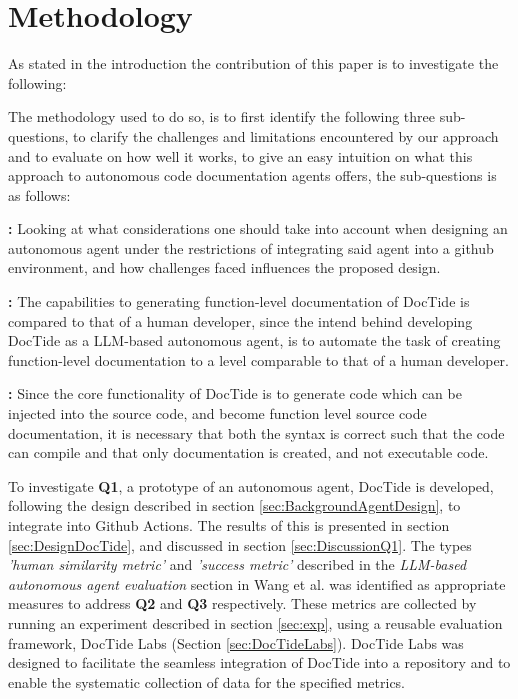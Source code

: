 \newcommand\itemb{\item[\textbf{Q2:}]}
\newcommand\itemc{\item[\textbf{Q3:}]}

\section{Methodology}
\label{sec:method}
As stated in the introduction the contribution of this paper is to investigate the following:
\begin{quote}
    \researchQuestion
\end{quote}
The methodology used to do so, is to first identify the following three sub-questions, to clarify the challenges and limitations encountered by our approach and to evaluate on how well it works, to give an easy intuition on what this approach to autonomous code documentation agents offers, the sub-questions is as follows:

\begin{qlist}
    \item \subquestionI\textbf{:}
    Looking at what considerations one should take into account when designing an autonomous agent under the restrictions of integrating said agent into a github environment, and how challenges faced influences the proposed design.
    \itemb \subquestionII\textbf{:}
    The capabilities to generating function-level documentation of DocTide is compared to that of a human developer, since the intend behind developing DocTide as a LLM-based autonomous agent, is to automate the task of creating function-level documentation to a level comparable to that of a human developer.
    \itemc \subquestionIII\textbf{:}
    Since the core functionality of DocTide is to generate code which can be injected into the source code, and become function level source code documentation, it is necessary that both the syntax is correct such that the code can compile and that only documentation is created, and not executable code.
\end{qlist}


To investigate \textbf{Q1}, a prototype of an autonomous agent, DocTide is developed, following the design described in section \ref{sec:BackgroundAgentDesign}, to integrate into Github Actions. The results of this is presented in section \ref{sec:DesignDocTide}, and discussed in section \ref{sec:DiscussionQ1}. The types \textit{'human similarity metric'} and \textit{'success metric'} described in the \textit{LLM-based autonomous agent evaluation} section in Wang et al.\cite{wang2024survey} was identified as appropriate measures to address \textbf{Q2} and \textbf{Q3} respectively. These metrics are collected by running an experiment described in section \ref{sec:exp}, using a reusable evaluation framework, DocTide Labs (Section \ref{sec:DocTideLabs}). DocTide Labs was designed to facilitate the seamless integration of DocTide into a repository and to enable the systematic collection of data for the specified metrics.

